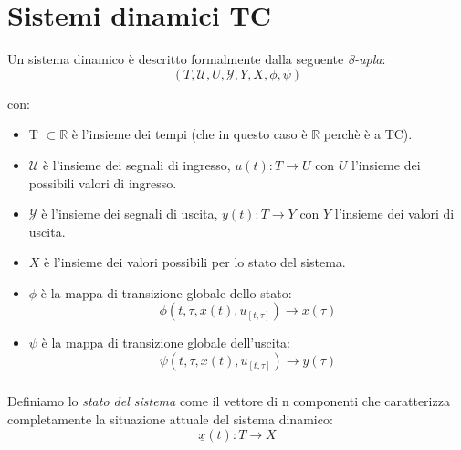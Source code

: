\chapter{Sistemi dinamici TC}
Un sistema dinamico è descritto formalmente dalla seguente \emph{8-upla}: 
\begin{equation}
	(T,\mathcal{U},U,\mathcal{Y},Y,X,\phi, \psi)
\end{equation}

con:
\begin{itemize}
	\item T $\subset \mathbb{R}$ è l'insieme dei tempi (che in questo caso è $\mathbb{R}$ perchè è a TC).
	\item $\mathcal{U}$ è l'insieme dei segnali di ingresso, $u(t):T\longrightarrow U$ con $U$ l'insieme dei possibili valori di ingresso.
	\item $\mathcal{Y}$ è l'insieme dei segnali di uscita, $y(t): T \longrightarrow Y$ con $Y$ l'insieme dei valori di uscita.
	\item $X$ è l'insieme dei valori possibili per lo stato del sistema.
	\item $\phi$ è la mappa di transizione globale dello stato:
	\begin{equation}
		\phi(t,\tau,x(t),u_{[t,\tau]}) \longrightarrow x(\tau)
	\end{equation}
	\item $\psi$ è la mappa di transizione globale dell'uscita:
	\begin{equation}
		\psi(t,\tau,x(t),u_{[t,\tau]}) \longrightarrow y(\tau)
	\end{equation}
\end{itemize}

\paragraph{}
Definiamo lo \emph{stato del sistema} come il vettore di n componenti che caratterizza completamente la situazione attuale del sistema dinamico:
\begin{equation}
	\underline{x}(t): T \longrightarrow X
\end{equation}

